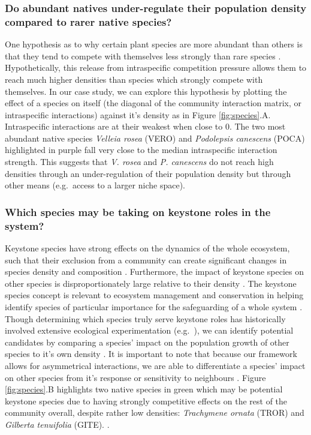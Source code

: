 \documentclass[a4,12pt]{article}
\begin{document}
    \subsubsection*{Do abundant natives under-regulate their population density compared to rarer native species?}
    One hypothesis as to why certain plant species are more abundant than others is that they tend to compete with themselves less strongly than rare species \parencite{Yenni2012, Yenni2017}. Hypothetically, this release from intraspecific competition pressure allows them to reach much higher densities than species which strongly compete with themselves. In our case study, we can explore this hypothesis by plotting the effect of a species on itself (the diagonal of the community interaction matrix, or intraspecific interactions) against it's density as in Figure \ref{fig:species}.A. Intraspecific interactions are at their weakest when close to $0$. The two most abundant native species \textit{Velleia rosea} (VERO) and \textit{Podolepsis canescens} (POCA) highlighted in purple fall very close to the median intraspecific interaction strength. This suggests that \textit{V. rosea} and \textit{P. canescens} do not reach high densities through an under-regulation of their population density but through other means (e.g.\ access to a larger niche space). 

    \subsubsection*{Which species may be taking on keystone roles in the system?}
    Keystone species have strong effects on the dynamics of the whole ecosystem, such that their exclusion from a community can create significant changes in species density and composition \parencite{Paine1969}. Furthermore, the impact of keystone species on other species is disproportionately large relative to their density \parencite{Power1996, Piraino2002, Libralato2006}. The keystone species concept is  relevant to ecosystem management and conservation in helping identify species of particular importance for the safeguarding of a whole system \parencite{Soule2005a}. Though determining which species truly serve keystone roles has historically involved extensive ecological experimentation (e.g.\ \cite{Paine1992}), we can identify potential candidates by comparing a species' impact on the population growth of other species to it's own density \parencite{Libralato2006}. It is important to note that because our framework allows for asymmetrical interactions, we are able to differentiate a species' impact on other species from it's response or sensitivity to neighbours \parencite{Broekman2020}. Figure \ref{fig:species}.B highlights two native species in green which may be potential keystone species due to having strongly competitive effects on the rest of the community overall, despite rather low densities: \textit{Trachymene ornata} (TROR) and \textit{Gilberta tenuifolia} (GITE). .
    
\end{document}
